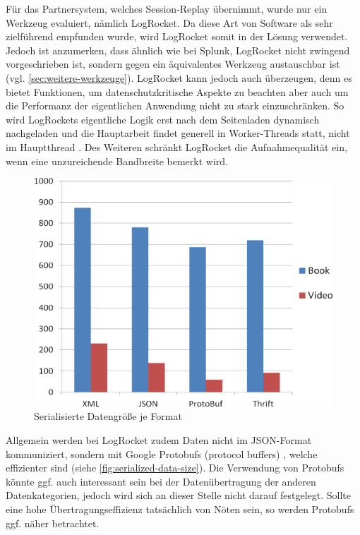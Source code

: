 	Für das Partnersystem, welches Session-Replay übernimmt, wurde nur ein Werkzeug evaluiert, nämlich LogRocket. Da diese Art von Software als sehr zielführend empfunden wurde, wird LogRocket somit in der Lösung verwendet. Jedoch ist anzumerken, dass ähnlich wie bei Splunk, LogRocket nicht zwingend vorgeschrieben ist, sondern gegen ein äquivalentes Werkzeug austauschbar ist (vgl. \autoref{sec:weitere-werkzeuge}). LogRocket kann jedoch auch überzeugen, denn es bietet Funktionen, um datenschutzkritische Aspekte zu beachten aber auch um die Performanz der eigentlichen Anwendung nicht zu stark einzuschränken. So wird LogRockets eigentliche Logik erst nach dem Seitenladen dynamisch nachgeladen und die Hauptarbeit findet generell in Worker-Threads statt, nicht im Hauptthread \cite{LogRocketPerformance}. Des Weiteren schränkt LogRocket die Aufnahmequalität ein, wenn eine unzureichende Bandbreite bemerkt wird.

\begin{figure}
\centering
\includegraphics[width=\linewidth]{img/04_erstellung-poc/ComparisonDataSerializationFormats_figure4.png}
\caption{Serialisierte Datengröße je Format \cite{ComparisonDataSerializationFormats}}
\label{fig:serialized-data-size}
\end{figure}
	
	Allgemein werden bei LogRocket zudem Daten nicht im JSON-Format kommuniziert, sondern mit Google Protobufs (protocol buffers) \cite{GoogleProtobufs}, welche effizienter sind (siehe \autoref{fig:serialized-data-size}). Die Verwendung von Protobufs könnte ggf. auch interessant sein bei der Datenübertragung der anderen Datenkategorien, jedoch wird sich an dieser Stelle nicht darauf festgelegt. Sollte eine hohe Übertragungseffizienz tatsächlich von Nöten sein, so werden Protobufs ggf. näher betrachtet.


